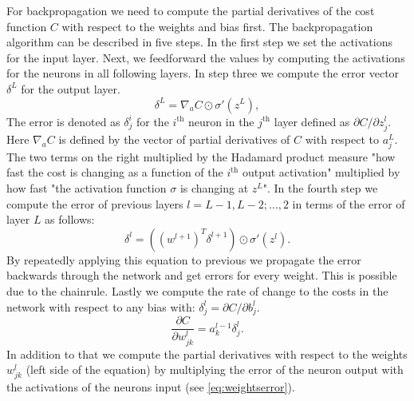 For backpropagation we need to compute the partial derivatives of the cost function \( C \) with respect to the weights and bias first. The backpropagation algorithm can be described in five steps. In the first step we set the activations for the input layer. Next, we feedforward the values by computing the activations for the neurons in all following layers. In step three we compute the error vector \( \delta^L \) for the output layer.
\begin{equation}
    \delta^L = \nabla_a C \odot \sigma'(z^L),
\end{equation}
The error is denoted as \( \delta^i_j \) for the \( i^{\text{th}} \) neuron in the \( j^\text{th} \) layer defined as \( \partial C / \partial z^l_j  \). Here \( \nabla_a C \) is defined by the vector of partial derivatives of \( C \) with respect to \( a^L_j \). The two terms on the right multiplied by the Hadamard product measure "how fast the cost is changing as a function of the \( i^{\text{th}} \) output activation" multiplied by how fast "the activation function \( \sigma \) is changing at \( z^L \)". \cite{Nielsen.2015} In the fourth step we compute the error of previous layers \( l=L-1, L-2; \dots, 2 \) in terms of the error of layer \( L \) as follows:
\begin{equation}
    \delta^l = ((w^{l+1})^T\delta^{l+1}) \odot \sigma'(z^l).
\end{equation}
By repeatedly applying this equation to previous we propagate the error backwards through the network and get errors for every weight. This is possible due to the chainrule. Lastly we compute the rate of change to the costs in the network with respect to any bias with: \( \delta^l_j = \partial C / \partial b^l_j \).
\begin{equation}
    \frac{\partial C}{\partial w^l_{jk}} = a^{l-1}_k \delta^l_j.
    \label{eq:weightserror}
\end{equation}
In addition to that we compute the partial derivatives with respect to the weights \( w^l_{jk} \) (left side of the equation) by multiplying the error of the neuron output with the activations of the neurons input (see \cref{eq:weightserror}). \cite{Nielsen.2015}

